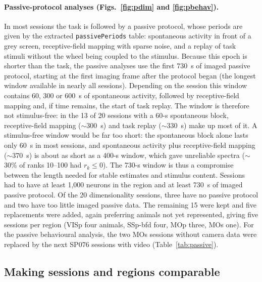 \documentclass[11pt]{article}
\begin{document}
\paragraph{Passive-protocol analyses (Figs.~\ref{fig:pdim} and \ref{fig:pbehav}).} In most sessions the task is followed by a passive protocol, whose periods are given by the extracted \texttt{passivePeriods} table: spontaneous activity in front of a grey screen, receptive-field mapping with sparse noise, and a replay of task stimuli without the wheel being coupled to the stimulus. Because this epoch is shorter than the task, the passive analyses use the first 730~s of imaged passive protocol, starting at the first imaging frame after the protocol began (the longest window available in nearly all sessions). Depending on the session this window contains 60, 300 or 600~s of spontaneous activity, followed by receptive-field mapping and, if time remains, the start of task replay. The window is therefore not stimulus-free: in the 13 of 20 sessions with a 60-s spontaneous block, receptive-field mapping ($\sim$300~s) and task replay ($\sim$330~s) make up most of it. A stimulus-free window would be far too short: the spontaneous block alone lasts only 60~s in most sessions, and spontaneous activity plus receptive-field mapping ($\sim$370~s) is about as short as a 400-s window, which gave unreliable spectra ($\sim$30\% of ranks 10--100 had $r_k \le 0$). The 730-s window is thus a compromise between the length needed for stable estimates and stimulus content. Sessions had to have at least 1,000 neurons in the region and at least 730~s of imaged passive protocol. Of the 20 dimensionality sessions, three have no passive protocol and two have too little imaged passive data. The remaining 15 were kept and five replacements were added, again preferring animals not yet represented, giving five sessions per region (VISp four animals, SSp-bfd four, MOp three, MOs one). For the passive behavioural analysis, the two MOs sessions without camera data were replaced by the next SP076 sessions with video (Table~\ref{tab:passive}).

\subsection{Making sessions and regions comparable}
\end{document}
